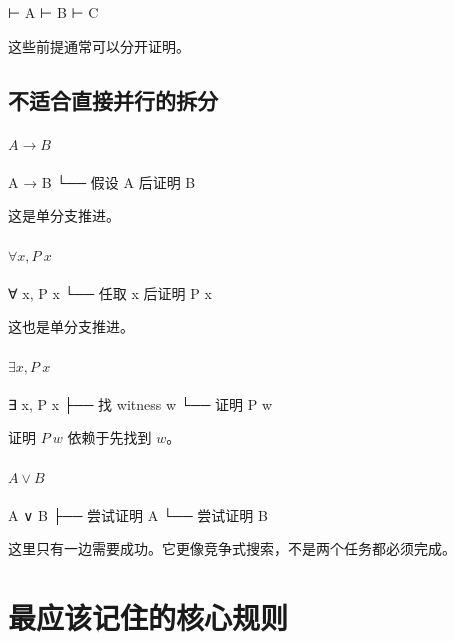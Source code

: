 \documentclass[UTF8,12pt]{ctexart}
\begin{document}
\begin{LeanCode}
⊢ A
⊢ B
⊢ C
\end{LeanCode}

这些前提通常可以分开证明。

\subsection{不适合直接并行的拆分}

\paragraph{\(A \to B\)}

\begin{Tree}
A → B
└── 假设 A 后证明 B
\end{Tree}

这是单分支推进。

\paragraph{\(\forall x, P\ x\)}

\begin{Tree}
∀ x, P x
└── 任取 x 后证明 P x
\end{Tree}

这也是单分支推进。

\paragraph{\(\exists x, P\ x\)}

\begin{Tree}
∃ x, P x
├── 找 witness w
└── 证明 P w
\end{Tree}

证明 \(P\ w\) 依赖于先找到 \(w\)。

\paragraph{\(A \lor B\)}

\begin{Tree}
A ∨ B
├── 尝试证明 A
└── 尝试证明 B
\end{Tree}

这里只有一边需要成功。它更像竞争式搜索，不是两个任务都必须完成。

\section{最应该记住的核心规则}
\end{document}
